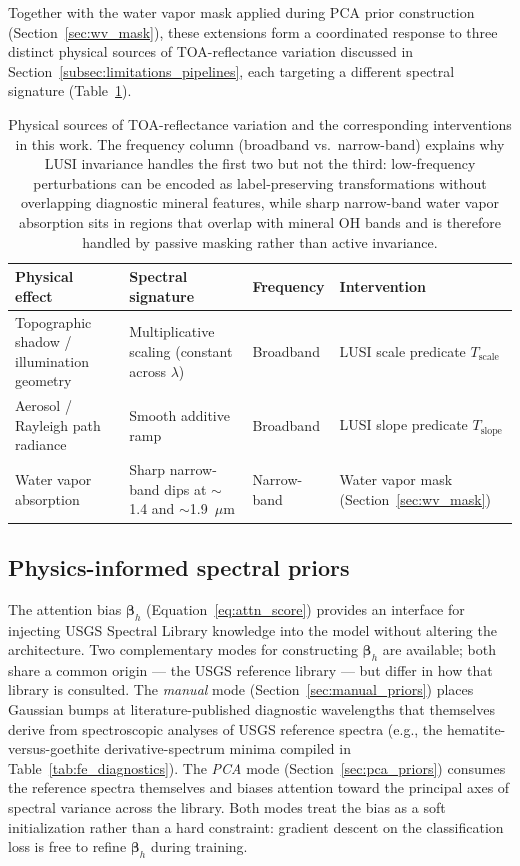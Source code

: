 \documentclass[preprint,12pt]{elsarticle}
\begin{document}
Together with the water vapor mask applied during PCA prior construction (Section~\ref{sec:wv_mask}), these extensions form a coordinated response to three distinct physical sources of TOA-reflectance variation discussed in Section~\ref{subsec:limitations_pipelines}, each targeting a different spectral signature (Table~\ref{tab:phys_interventions}).
\begin{table}[!htbp]
\centering
\small
\caption{Physical sources of TOA-reflectance variation and the corresponding interventions in this work. 
The frequency column (broadband vs.\ narrow-band) explains why LUSI invariance handles the first two but not the third: low-frequency perturbations can be encoded as label-preserving transformations without overlapping diagnostic mineral features, while sharp narrow-band water vapor absorption sits in regions that overlap with mineral OH bands and is therefore handled by passive masking rather than active invariance.}
\label{tab:phys_interventions}
\begin{tabular}{p{}p{}p{}p{}}
\hline
\rowcolor[gray]{0.85}
\textbf{Physical effect} & \textbf{Spectral signature} & \textbf{Frequency} & \textbf{Intervention} \\
\hline
Topographic shadow / illumination geometry & Multiplicative scaling (constant across $\lambda$) & Broadband & LUSI scale predicate $T_{\text{scale}}$ \\
\hline
Aerosol / Rayleigh path radiance & Smooth additive ramp & Broadband & LUSI slope predicate $T_{\text{slope}}$ \\
\hline
Water vapor absorption & Sharp narrow-band dips at $\sim$1.4 and $\sim$1.9~$\mu$m & Narrow-band & Water vapor mask (Section~\ref{sec:wv_mask}) \\
\hline
\end{tabular}
\end{table}

\subsection{Physics-informed spectral priors}
\label{sec:physics}

The attention bias $\bm{\beta}_h$ (Equation~\ref{eq:attn_score}) provides an interface for injecting USGS Spectral Library knowledge into the model without altering the architecture.
Two complementary modes for constructing $\bm{\beta}_h$ are available; both share a common origin --- the USGS reference library --- but differ in how that library is consulted.
The \emph{manual} mode (Section~\ref{sec:manual_priors}) places Gaussian bumps at literature-published diagnostic wavelengths that themselves derive from spectroscopic analyses of USGS reference spectra (e.g., the hematite-versus-goethite derivative-spectrum minima compiled in Table~\ref{tab:fe_diagnostics}).
The \emph{PCA} mode (Section~\ref{sec:pca_priors}) consumes the reference spectra themselves and biases attention toward the principal axes of spectral variance across the library.
Both modes treat the bias as a soft initialization rather than a hard constraint: gradient descent on the classification loss is free to refine $\bm{\beta}_h$ during training.
\end{document}
